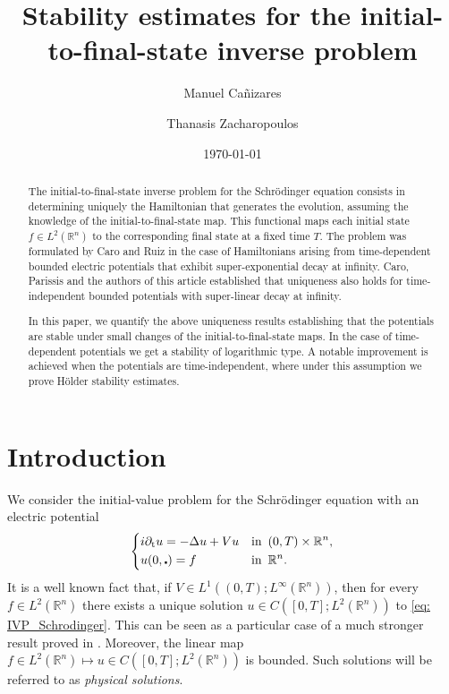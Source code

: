 \documentclass[10pt,a4paper]{amsart}
\title[Stability initial to final]{Stability estimates for the initial-to-final-state inverse problem}
\author[M. Cañizares]{Manuel Cañizares}
\author[T. Zacharopoulos]{Thanasis Zacharopoulos}
\theoremstyle{remark}
\theoremstyle{definition}
\newcommand{\R}{\mathbb{R}}
\newcommand{\tm}{\mathrm{t}}
\begin{document}
\begin{abstract}
The initial-to-final-state inverse problem for the Schr\"odinger equation consists in determining uniquely the Hamiltonian that generates the evolution, assuming the knowledge of the initial-to-final-state map. 
This functional maps each initial state $f\in L^2(\R^n)$ to the corresponding final state at a fixed time $T$. The problem was formulated by Caro and Ruiz in the case of Hamiltonians arising from time-dependent bounded electric potentials that exhibit super-exponential decay at infinity. Caro, Parissis and the authors of this article established that uniqueness also holds for time-independent bounded potentials with super-linear decay at infinity. 

In this paper, we quantify the above uniqueness results establishing that the potentials are stable under small changes of the initial-to-final-state maps. In the case of time-dependent potentials we get a stability of logarithmic type. A notable improvement is achieved when the potentials are time-independent, where under this assumption we prove H\"older stability estimates.
\end{abstract}


\date{\today}



\maketitle


\section{Introduction}

We consider the initial-value problem for the Schr\"odinger equation with an electric potential
\begin{equation}\label{eq: IVP_Schrodinger}
	\left\{
		\begin{aligned}
		& i\partial_\tm u = - \Delta u + V u & & \textnormal{in} \enspace (0,T) \times \R^n, \\
		& u(0, \centerdot) = f &  & \textnormal{in} \enspace \R^n.
		\end{aligned}
	\right.
\end{equation}
It is a well known fact that, if $V \in L^1((0,T); L^\infty(\R^n))$, then for every $f \in L^2(\R^n)$
there exists a unique solution 
$u \in C([0,T]; L^2(\R^n))$ to \eqref{eq: IVP_Schrodinger}. This can be seen as a particular case of a much stronger result proved in \cite{zbMATH02204588}.
Moreover, the linear map 
$ f \in L^2(\R^n) \mapsto u \in C([0, T]; L^2(\R^n)) $ is bounded.
Such solutions will be referred to as \emph{physical solutions}.
\end{document}
